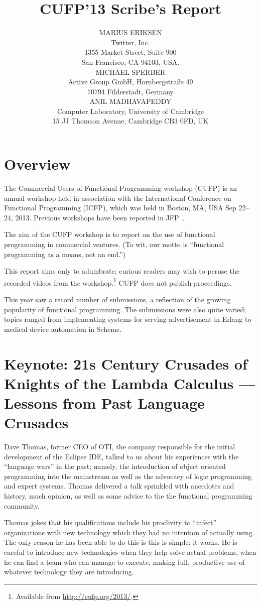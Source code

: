 \documentclass{jfp1}
\title{CUFP'13 Scribe's Report}
\author[Marius Eriksen, Michael Sperber and Anil Madhavapeddy]
       {MARIUS ERIKSEN\\
        Twitter, Inc.\\
        1355 Market Street, Suite 900 \\
        San Francisco, CA 94103, USA.\\
        MICHAEL SPERBER\\
         Active Group GmbH, Hornbergstra\ss{}e 49\\
         70794 Filderstadt, Germany\\
         ANIL MADHAVAPEDDY\\
        Computer Laboratory, University of Cambridge\\ 
        15 JJ Thomson Avenue, Cambridge CB3 0FD, UK}
\begin{document}
\maketitle

\tableofcontents

\section{Overview}

The Commercial Users of Functional Programming workshop (CUFP) is an
annual workshop held in association with the International Conference
on Functional Programming (ICFP), which was held in Boston, MA, USA
Sep 22--24, 2013. Previous workshops have been reported in JFP~\cite{JFP:9147276,JFP:8514633}.

The aim of the CUFP workshop is to report on the use of functional
programming in commercial ventures. (To wit, our motto is ``functional
programming as a means, not an end.'')

This report aims only to adumbrate; curious readers may wish to peruse
the recorded videos from the workshop.\footnote{Available from
  \url{http://cufp.org/2013/}.} CUFP does not
publish proceedings.

This year saw a record number of submissions, a reflection of the
growing popularity of functional programming. The submissions were
also quite varied; topics ranged from implementing systems for serving
advertisement
in Erlang to medical device automation in Scheme.

\section{Keynote: 21s Century Crusades of Knights of the Lambda
Calculus — Lessons from Past Language Crusades}

Dave Thomas, former CEO of OTI, the company responsible for the
initial development of the Eclipse IDE, talked to us about his
experiences with the ``language wars'' in the past; namely, the
introduction of object oriented programming into the mainstream as
well as the advocacy of logic programming and expert systems. Thomas
delivered a talk sprinkled with anecdotes and history, much opinion,
as well as some advice to the the functional programming community.


Thomas jokes that his qualifications include his proclivity to
``infect'' organizations with new technology which they had no
intention of actually using. The only reason he has been able to do
this is this is simple: it works. He is careful to introduce new
technologies when they help solve actual problems, when he can find a
team who can manage to execute, making full, productive use of
whatever technology they are introducing.
\end{document}
